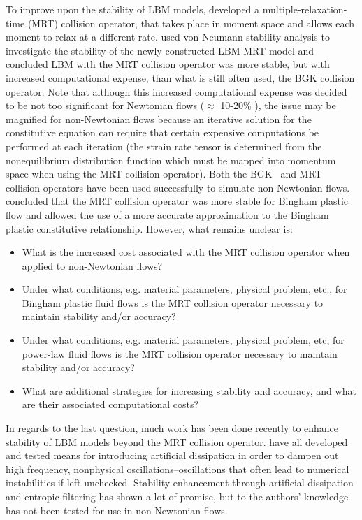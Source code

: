 \documentclass{article}
\begin{document}
To improve upon the stability of LBM models, \citet{d1994generalized} developed a multiple-relaxation-time (MRT) collision operator, that takes place in moment space and allows each moment to relax at a different rate.
\citet{lallemand2000theory} used von Neumann stability analysis to investigate the stability of the newly constructed LBM-MRT model and concluded LBM with the MRT collision operator was more stable, but with increased computational expense, than what is still often used, the BGK collision operator.
Note that although this increased computational expense was decided to be not too significant for Newtonian flows ($\approx$ 10-20\% \cite{lallemand2000theory}), the issue may be magnified for non-Newtonian flows because an iterative solution for the constitutive equation can require that certain expensive computations be performed at each iteration (the strain rate tensor is determined from the nonequilibrium distribution function which must be mapped into momentum space when using the MRT collision operator).
Both the BGK~\cite{wang2011lattice,ashrafizaadeh2009comparison,wang2015localized,tang2011bingham} and MRT~\cite{chen2014simulations,fallah2012multiple,chai2011multiple} collision operators have been used successfully to simulate non-Newtonian flows.
\citeauthor{chen2014simulations} concluded that the MRT collision operator was more stable for Bingham plastic flow and allowed the use of a more accurate approximation to the Bingham plastic constitutive relationship.
However, what remains unclear is:
\begin{itemize}
    \item What is the increased cost associated with the MRT collision operator when applied to non-Newtonian flows?
    \item Under what conditions, e.g. material parameters, physical problem, etc., for Bingham plastic fluid flows is the MRT collision operator necessary to maintain stability and/or accuracy?
    \item Under what conditions, e.g. material parameters, physical problem, etc, for power-law fluid flows is the MRT collision operator necessary to maintain stability and/or accuracy?
    \item What are additional strategies for increasing stability and accuracy, and what are their associated computational costs?
\end{itemize}
In regards to the last question, much work has been done recently to enhance stability of LBM models beyond the MRT collision operator.
\citet{brownlee2006stabilization,brownlee2007stability,brownlee2008nonequilibrium,packwood2009entropy,gorban2014enhancement} have all developed and tested means for introducing artificial dissipation in order to dampen out high frequency, nonphysical oscillations--oscillations that often lead to numerical instabilities if left unchecked.
Stability enhancement through artificial dissipation and entropic filtering has shown a lot of promise, but to the authors' knowledge has not been tested for use in non-Newtonian flows.
\end{document}
